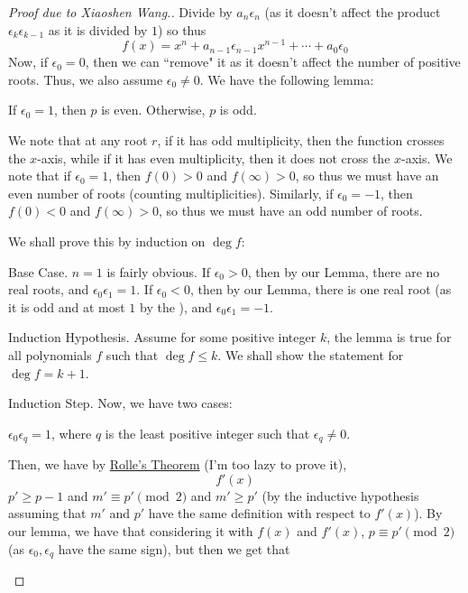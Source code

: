 \documentclass[11pt,titlepage]{scrartcl}
\begin{document}
\begin{proof}[Proof due to Xiaoshen Wang.]
Divide by $a_n\epsilon_n$ (as it doesn't affect the product $\epsilon_k\epsilon_{k-1}$ as it is divided by $1$) so thus
\[f(x)=x^n+a_{n-1}\epsilon_{n-1}x^{n-1}+\cdots+a_0\epsilon_0\]
Now, if $\epsilon_0=0$, then we can ``remove" it as it doesn't affect the number of positive roots. Thus, we also assume $\epsilon_0\neq 0$. We have the following lemma:
\begin{Lemma}
If $\epsilon_0=1$, then $p$ is even. Otherwise, $p$ is odd.
\end{Lemma}
\begin{subproof}
We note that at any root $r$, if it has odd multiplicity, then the function crosses the $x$-axis, while if it has even multiplicity, then it does not cross the $x$-axis. We note that if $\epsilon_0=1$, then $f(0)>0$ and $f(\infty)>0$, so thus we must have an even number of roots (counting multiplicities). Similarly, if $\epsilon_0=-1$, then $f(0)<0$ and $f(\infty)>0$, so thus we must have an odd number of roots.
\end{subproof}
We shall prove this by induction on $\deg f$:
\begin{induction_snippet}{Base Case.}
$n=1$ is fairly obvious. If $\epsilon_0>0$, then by our Lemma, there are no real roots, and $\epsilon_0\epsilon_1=1$. If $\epsilon_0<0$, then by our Lemma, there is one real root (as it is odd and at most $1$ by the ), and $\epsilon_0\epsilon_1=-1$.
\end{induction_snippet}
\begin{induction_snippet}{Induction Hypothesis.}
Assume for some positive integer $k$, the lemma is true for all polynomials $f$ such that $\deg f\leq k$. We shall show the statement for $\deg f=k+1$.
\end{induction_snippet}
\begin{induction_snippet}{Induction Step.}
Now, we have two cases:
\begin{altcase}
$\epsilon_0\epsilon_q=1$, where $q$ is the least positive integer such that $\epsilon_q\neq 0$.
\end{altcase}
Then, we have by \href{https://en.wikipedia.org/wiki/Rolle's_theorem}{Rolle's Theorem} (I'm too lazy to prove it),
\[f'(x)\]
$p'\geq p-1$ and $m'\equiv p'\pmod 2$ and $m'\geq p'$ (by the inductive hypothesis assuming that $m'$ and $p'$ have the same definition with respect to $f'(x)$). By our lemma, we have that considering it with $f(x)$ and $f'(x)$, $p\equiv p'\pmod 2$ (as $\epsilon_0,\epsilon_q$ have the same sign), but then we get that

\end{induction_snippet}
\end{proof}
\end{document}
